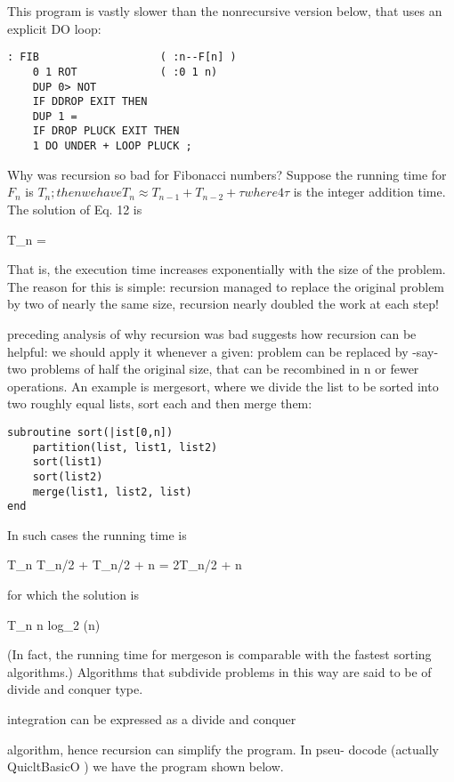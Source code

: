 This program is vastly slower than the nonrecursive version below, that uses an explicit DO loop:
\begin{lstlisting}
: FIB                   ( :n--F[n] )
    0 1 ROT             ( :0 1 n)
    DUP 0> NOT
    IF DDROP EXIT THEN
    DUP 1 =
    IF DROP PLUCK EXIT THEN
    1 DO UNDER + LOOP PLUCK ;
\end{lstlisting}
Why was recursion so bad for Fibonacci numbers? Suppose the running time for $F_n$ is $T_n; then we have

T_{n} \approx T_{n-1} + T_{n-2} + \tau

where 4\tau$ is the integer addition time. The solution of Eq. 12 is

T_{n} = \tau[(\frac{1+\sqrt{5}}}{2})^n - 1]

That is, the execution time increases exponentially with the size of the problem. The reason for this is simple: recursion managed to replace the original problem by two of nearly the same size, \ie recursion nearly doubled the work at each step!

 preceding analysis of why recursion was bad suggests how recursion can be helpful: we should apply it whenever a given: problem can be replaced by -say- two problems of half the original size, that can be recombined in n or fewer operations. An example is mergesort, where we divide the list to be sorted into two roughly equal lists, sort each and then merge them:

\begin{verbatim}
subroutine sort(|ist[0,n])
    partition(list, list1, list2)
    sort(list1)
    sort(list2)
    merge(list1, list2, list)
end
\end{verbatim}

In such cases the running time is

T_{n} \approx T_{n/2} + T_{n/2} + n = 2T_{n/2} + n

for which the solution is

T_{n} \approx n log_2 (n)

(In fact, the running time for mergeson is comparable with the fastest sorting algorithms.) Algorithms that subdivide problems in this way are said to be of divide and conquer type.

 integration can be expressed as a divide and conquer

algorithm, hence recursion can simplify the program. In pseu-
docode (actually QuicltBasicO ) we have the program shown
below.

